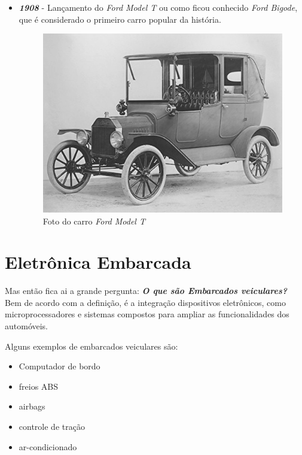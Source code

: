 \documentclass[12pt]{article}
\begin{document}
\begin{itemize}
\begin{figure}[htp]
            \end{figure}

            \item \textbf{\emph{1908}} - Lançamento do \emph{Ford Model T} ou como ficou conhecido \emph{Ford Bigode}, que é considerado o primeiro carro popular
            da história.

            \begin{figure}[htp]

                \centering
                \includegraphics[scale=1]{modelt.png}
                \caption{\centering Foto do carro \emph{Ford Model T}}

            \end{figure}

    \end{itemize}

    \section{Eletrônica Embarcada} \label{sec:embarcado}

    Mas então fica ai a grande pergunta: \textbf{\emph{O que são Embarcados veiculares?}} Bem de acordo com a definição, é a integração dispositivos eletrônicos, como
    microprocessadores e sistemas compostos para ampliar as funcionalidades dos automóveis.

    Alguns exemplos de embarcados veiculares são:

    \begin{itemize}

        \item Computador de bordo 
        
        \item freios ABS
        
        \item airbags 
        
        \item controle de tração
        
        \item ar-condicionado
        
    \end{itemize}
\end{document}
